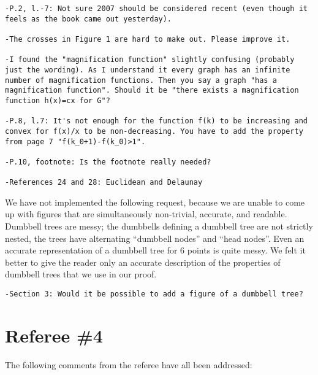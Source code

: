 \documentclass{patmorin}
\begin{document}
\begin{Verbatim}[frame=single]
-P.2, l.-7: Not sure 2007 should be considered recent (even though it
feels as the book came out yesterday).

-The crosses in Figure 1 are hard to make out. Please improve it.

-I found the "magnification function" slightly confusing (probably
just the wording). As I understand it every graph has an infinite
number of magnification functions. Then you say a graph "has a
magnification function". Should it be "there exists a magnification
function h(x)=cx for G"?

-P.8, l.7: It's not enough for the function f(k) to be increasing and
convex for f(x)/x to be non-decreasing. You have to add the property
from page 7 "f(k_0+1)-f(k_0)>1".

-P.10, footnote: Is the footnote really needed?

-References 24 and 28: Euclidean and Delaunay

\end{Verbatim}

We have not implemented the following request, because we are unable to
come up with figures that are simultaneously non-trivial, accurate, and
readable.  Dumbbell trees are messy; the dumbbells defining a dumbbell
tree are not strictly nested, the trees have alternating ``dumbbell
nodes'' and ``head nodes''.  Even an accurate representation of a dumbbell
tree for 6 points is quite messy.  We felt it better to give the reader
only an accurate description of the properties of dumbbell trees that
we use in our proof.

\begin{Verbatim}[frame=single]
-Section 3: Would it be possible to add a figure of a dumbbell tree?
\end{Verbatim}

\section{Referee \#4}

The following comments from the referee have all been addressed:
\end{document}
